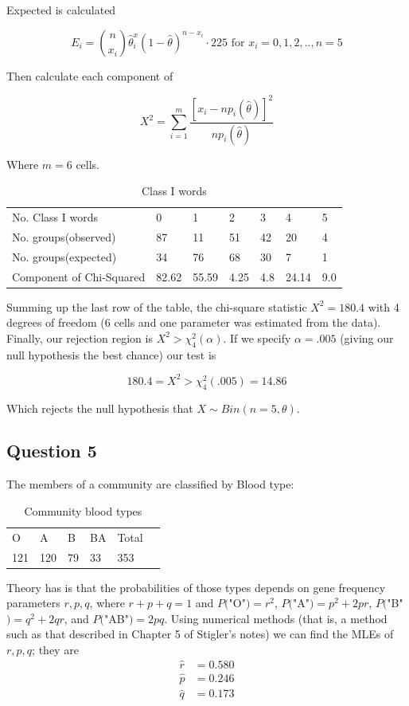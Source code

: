 \documentclass{tufte-book}
\theoremstyle{mytheoremstyle}
\theoremstyle{mylemstyle}
\theoremstyle{mydefstyle}
\begin{document}
Expected is calculated

\[ E_i = \binom{n}{x_i} \hat{\theta}^x_i (1-\hat{\theta})^{n-x_i} \cdot 225 \text{ for } x_i = 0,1,2,..,n=5 \]

Then calculate each component of

\[ X^2 = \sum_{i=1}^m \frac{[x_i - np_i(\hat{\theta})]^2}{np_i(\hat{\theta})}\]

Where $m=6$ cells.

\begin{table}
\centering
\begin{tabular}{l|llllll}
No. Class I words & 0 & 1 & 2 & 3 & 4 & 5 \\
No. groups(observed) & 87 & 11 & 51 & 42 & 20 & 4 \\
No. groups(expected) &34&76&68&30&7&1\\
Component of Chi-Squared &82.62&55.59&4.25&4.8&24.14&9.0
\end{tabular}
\caption{Class I words}
\label{millwords}
\end{table}

Summing up the last row of the table, the chi-square statistic $X^2=180.4$ with 4 degrees of freedom (6 cells and one parameter was estimated from the data).  Finally, our rejection region is $X^2 > \chi_4^2(\alpha)$.  If we specify $\alpha=.005$ (giving our null hypothesis the best chance) our test is

\[ 180.4 = X^2 > \chi_4^2(.005) = 14.86 \]

Which rejects the null hypothesis that $X \sim Bin(n=5, \theta)$.


\subsection{Question 5}
The members of a community are classified by Blood type:

\begin{table}
\centering
\begin{tabular}{llllll}
O&A&B&BA&Total\\
121&120&79&33&353
\end{tabular}
\caption{Community blood types}
\label{bloodtypes}
\end{table}

Theory has is that the probabilities of those types depends on gene frequency parameters $r,p,q$, where $r+p+q=1$ and $P($"O"$)=r^2$, $P($"A"$)=p^2+2pr$, $P($"B"$)=q^2+2qr$, and $P($"AB"$)=2pq$.  Using numerical methods (that is, a method such as that described in Chapter 5 of Stigler's notes) we can find the MLEs of $r,p,q$; they are
\begin{align*}
\hat{r} &= 0.580 \\
\hat{p} &= 0.246 \\
\hat{q} &= 0.173 \\
\end{align*}
\end{document}
